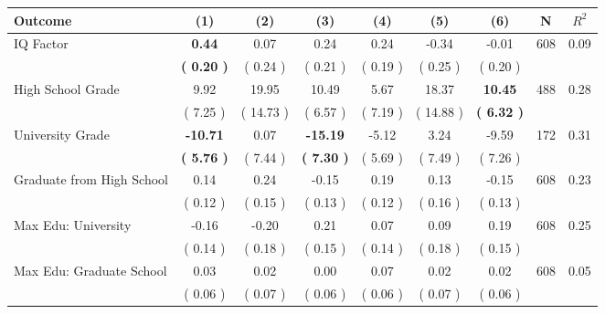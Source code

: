\begin{tabular}{lcccccccc}
\toprule
 \textbf{Outcome} & \textbf{(1)} & \textbf{(2)} & \textbf{(3)} & \textbf{(4)} & \textbf{(5)} & \textbf{(6)} & \textbf{N} & \textbf{$ R^2$} \\
\midrule
IQ Factor & \textbf{     0.44} &      0.07 &      0.24 &      0.24 &     -0.34 &     -0.01 & 608 &       0.09 \\ 
 & \textbf{(     0.20 )} & (     0.24 ) & (     0.21 ) & (     0.19 ) & (     0.25 ) & (     0.20 ) & \\
High School Grade &      9.92 &     19.95 &     10.49 &      5.67 &     18.37 & \textbf{    10.45} & 488 &       0.28 \\ 
 & (     7.25 ) & (    14.73 ) & (     6.57 ) & (     7.19 ) & (    14.88 ) & \textbf{(     6.32 )} & \\
University Grade & \textbf{   -10.71} &      0.07 & \textbf{   -15.19} &     -5.12 &      3.24 &     -9.59 & 172 &       0.31 \\ 
 & \textbf{(     5.76 )} & (     7.44 ) & \textbf{(     7.30 )} & (     5.69 ) & (     7.49 ) & (     7.26 ) & \\
Graduate from High School &      0.14 &      0.24 &     -0.15 &      0.19 &      0.13 &     -0.15 & 608 &       0.23 \\ 
 & (     0.12 ) & (     0.15 ) & (     0.13 ) & (     0.12 ) & (     0.16 ) & (     0.13 ) & \\
Max Edu: University &     -0.16 &     -0.20 &      0.21 &      0.07 &      0.09 &      0.19 & 608 &       0.25 \\ 
 & (     0.14 ) & (     0.18 ) & (     0.15 ) & (     0.14 ) & (     0.18 ) & (     0.15 ) & \\
Max Edu: Graduate School &      0.03 &      0.02 &      0.00 &      0.07 &      0.02 &      0.02 & 608 &       0.05 \\ 
 & (     0.06 ) & (     0.07 ) & (     0.06 ) & (     0.06 ) & (     0.07 ) & (     0.06 ) & \\
\bottomrule
\end{tabular}
